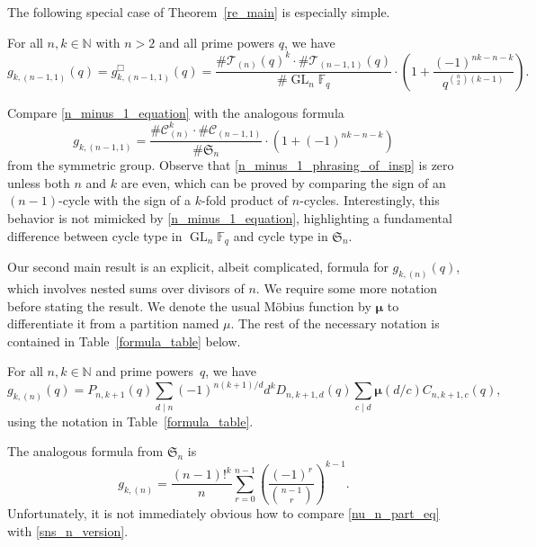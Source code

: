 \documentclass[Unicode,ALCO]{cedram}
\DeclareMathOperator{\GL}{GL}
\newcommand{\CC}{\mathcal{C}}
\newcommand{\F}{\mathbb{F}}
\newcommand{\N}{\mathbb{N}}
\newcommand{\FS}{\mathfrak{S}}
\newcommand{\CT}{\mathcal{T}}
\newcommand{\moebius}{\pmb{\mu}}
\begin{document}
The following special case of Theorem~\ref{re_main} is especially simple.
\begin{corollary}
\label{n_minus_1_corollary}
For all \(n,k \in \N\) with \(n > 2\) and all prime powers \(q\), we have
\begin{equation}
\label{n_minus_1_equation}
g_{k,(n-1,1)} (q)
=
g^\Box_{k,(n-1,1)} (q)
=
\frac{\# \CT_{(n)} (q)^k
\cdot
\# \CT_{(n-1,1)} (q)}{\# \GL_n \F_q}
\cdot
\left (
1 + \frac{(-1)^{nk-n-k}}{q^{\binom{n}{2}(k-1)}}
\right ).
\end{equation}
\end{corollary}

Compare \eqref{n_minus_1_equation}
with the analogous formula
\begin{equation}
\label{n_minus_1_phrasing_of_insp}
g_{k,(n-1,1)}
=
\frac{\# \CC_{(n)}^k
\cdot
\# \CC_{(n-1,1)}}{\# \FS_n}
\cdot
\left (
1 + (-1)^{nk-n-k}
\right )
\end{equation}
from the symmetric group.
Observe that \eqref{n_minus_1_phrasing_of_insp} is zero unless both \(n\) and \(k\) are even, which can be proved by comparing the sign of an \((n-1)\)-cycle with the sign of a \(k\)-fold product of \(n\)-cycles.
Interestingly, this behavior is not mimicked by \eqref{n_minus_1_equation}, highlighting a fundamental difference between cycle type in \(\GL_n \F_q\) and cycle type in \(\FS_n\).

Our second main result is an explicit, albeit complicated, formula for \(g_{k,(n)} (q)\), which involves nested sums over divisors of \(n\).
We require some more notation before stating the result.
We denote the usual M\"obius function by \(\moebius\) to differentiate it from a partition named \(\mu\).
The rest of the necessary notation is contained in Table~\ref{formula_table} below.




\begin{theorem}
\label{nu_n_part}
For all \(n, k \in \N\) and prime powers~\(q\),
we have
\begin{equation}
\label{nu_n_part_eq}
g_{k,(n)}(q) = P_{n,k+1} (q)
\sum_{d \mid n}
(-1)^{n(k+1)/d}
d^{k}
D_{n,k+1,d} (q)
\sum_{c \mid d}
\moebius(d/c)
C_{n,k+1,c} (q),
\end{equation}
using the notation in Table~\ref{formula_table}.
\end{theorem}


The analogous formula from \(\FS_n\) is
\begin{equation}
\label{sns_n_version}
g_{k,(n)}
=
\frac{(n-1)!^{k}}{n}
\sum_{r=0}^{n-1}
\left (
\frac{(-1)^r}{\binom{n-1}{r}}
\right )^{k-1}.
\end{equation}
Unfortunately, it is not immediately obvious how to compare \eqref{nu_n_part_eq} with \eqref{sns_n_version}.
\end{document}
